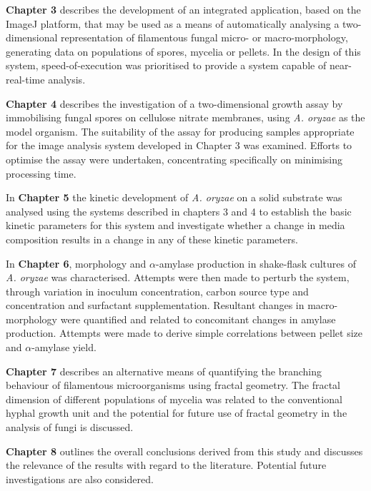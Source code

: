 \textbf{Chapter 3} describes the development of an integrated application, based on the ImageJ platform, that may be used as a means of automatically analysing a two-dimensional representation of filamentous fungal micro- or macro-morphology, generating data on populations of spores, mycelia or pellets. In the design of this system, speed-of-execution was prioritised to provide a system capable of near-real-time analysis.

\textbf{Chapter 4} describes the investigation of a two-dimensional growth assay by immobilising fungal spores on cellulose nitrate membranes, using \emph{A. oryzae} as the model organism. The suitability of the assay for producing samples appropriate for the image analysis system developed in Chapter 3 was examined. Efforts to optimise the assay were undertaken, concentrating specifically on minimising processing time.

In \textbf{Chapter 5} the kinetic development of \emph{A. oryzae} on a solid substrate was analysed using the systems described in chapters 3 and 4 to establish the basic kinetic parameters for this system and investigate whether a change in media composition results in a change in any of these kinetic parameters.

In \textbf{Chapter 6}, morphology and $\alpha$-amylase production in shake-flask cultures of \emph{A. oryzae} was characterised. Attempts were then made to perturb the system, through variation in inoculum concentration, carbon source type and concentration and surfactant supplementation. Resultant changes in macro-morphology were quantified and related to concomitant changes in amylase production. Attempts were made to derive simple correlations between pellet size and $\alpha$-amylase yield.

\textbf{Chapter 7} describes an alternative means of quantifying the branching behaviour of filamentous microorganisms using fractal geometry. The fractal dimension of different populations of mycelia was related to the conventional hyphal growth unit and the potential for future use of fractal geometry in the analysis of fungi is discussed.

\textbf{Chapter 8} outlines the overall conclusions derived from this study and discusses the relevance of the results with regard to the literature. Potential future investigations are also considered.